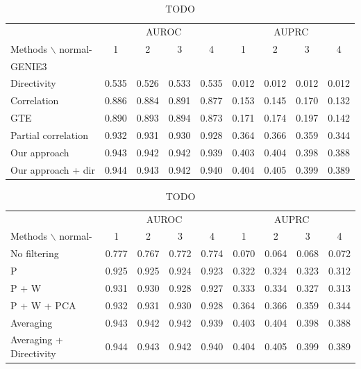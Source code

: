 \documentclass[wcp]{jmlr}
\begin{document}
\begin{table}[tbh]
\centering
\caption{TODO}
\begin{tabular}{@{}l *{8}{c}@{}}
\toprule
  & \multicolumn{4}{c}{AUROC} & \multicolumn{4}{c}{AUPRC} \\
\cmidrule(r){2-5}\cmidrule(r){6-9}
Methods $\backslash$ normal- & 1 & 2 & 3 & 4 & 1 & 2 & 3 & 4 \\
\midrule
GENIE3                 & & & & & & & & \\
Directivity            & 0.535 & 0.526 & 0.533 & 0.535 & 0.012 & 0.012 & 0.012 & 0.012 \\
Correlation            & 0.886 & 0.884 & 0.891 & 0.877 & 0.153 & 0.145 & 0.170 & 0.132 \\
GTE                    & 0.890 & 0.893 & 0.894 & 0.873 & 0.171 & 0.174 & 0.197 & 0.142 \\
Partial correlation    & 0.932 & 0.931 & 0.930 & 0.928 & 0.364 & 0.366 & 0.359 & 0.344 \\
Our approach           & 0.943 & 0.942 & 0.942 & 0.939 & 0.403 & 0.404 & 0.398 & 0.388 \\
Our approach + dir     & 0.944 & 0.943 & 0.942 & 0.940 & 0.404 & 0.405 & 0.399 & 0.389 \\
\bottomrule
\end{tabular}
\end{table}

\begin{table}[tbh]
\centering
\caption{TODO}
\begin{tabular}{@{}l *{8}{c}@{}}
\toprule
  & \multicolumn{4}{c}{AUROC} & \multicolumn{4}{c}{AUPRC} \\
\cmidrule(r){2-5}\cmidrule(r){6-9}
Methods $\backslash$ normal- & 1 & 2 & 3 & 4 & 1 & 2 & 3 & 4 \\
\midrule
No  filtering       & 0.777 & 0.767 & 0.772 & 0.774 & 0.070 & 0.064 & 0.068 & 0.072\\
P                   & 0.925 & 0.925 & 0.924 & 0.923 & 0.322 & 0.324 & 0.323 & 0.312\\
P + W               & 0.931 & 0.930 & 0.928 & 0.927 & 0.333 & 0.334 & 0.327 & 0.313\\
P + W + PCA         & 0.932 & 0.931 & 0.930 & 0.928 & 0.364 & 0.366 & 0.359 & 0.344\\
Averaging           & 0.943 & 0.942 & 0.942 & 0.939 & 0.403 & 0.404 & 0.398 & 0.388\\
Averaging + Directivity & 0.944 & 0.943 & 0.942 & 0.940 & 0.404 & 0.405 & 0.399 & 0.389\\
\bottomrule
\end{tabular}
\end{table}
\end{document}
